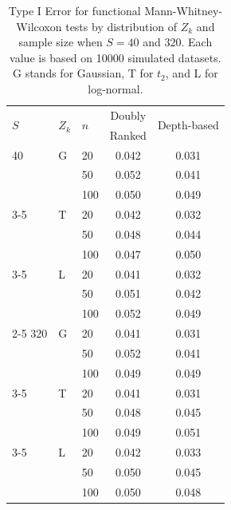 \documentclass[12pt]{article}
\theoremstyle{plain}
\begin{document}
\begin{table}
	\centering
	\caption{Type I Error for functional Mann-Whitney-Wilcoxon tests by distribution of $Z_k$ and sample size when $S = 40$ and 320. Each value is based on 10000 simulated datasets. G stands for Gaussian, T for $t_2$, and L for log-normal. \label{t:mwwe}}
	\begin{tabular}{lllcc}
		  \hline
		 \multirow{2}{*}{$S$} & \multirow{2}{*}{$Z_k$} & \multirow{2}{*}{$n$} &  Doubly & \multirow{2}{*}{Depth-based}  \\
		 &  &  & Ranked &  \\ 
		  \hline
		40 & G  &  20 & 0.042 & 0.031 \\ 
		& &  50 & 0.052 & 0.041 \\ 
		& & 100 & 0.050 & 0.049 \\ 
		\cline{3-5}
		& T & 20 & 0.042 & 0.032 \\ 
		& & 50 & 0.048 & 0.044 \\ 
		& & 100 & 0.047 & 0.050 \\ 
		\cline{3-5}
		& L & 20 & 0.041 & 0.032 \\ 
		& & 50 & 0.051 & 0.042 \\ 
		& & 100 & 0.052 & 0.049 \\ 
		 \cline{2-5}
		320 & G  &  20 & 0.041 & 0.031 \\ 
		& &  50 & 0.052 & 0.041 \\ 
		& & 100 & 0.049 & 0.049 \\ 
		\cline{3-5}
		& T & 20 & 0.041 & 0.031 \\ 
		& & 50 & 0.048 & 0.045 \\ 
		& & 100 & 0.049 & 0.051 \\ 
		\cline{3-5}
		& L & 20 & 0.042 & 0.033 \\ 
		& & 50 & 0.050 & 0.045 \\ 
		&  & 100 & 0.050 & 0.048 \\ 
		 \hline
	\end{tabular}
\end{table}
\end{document}
